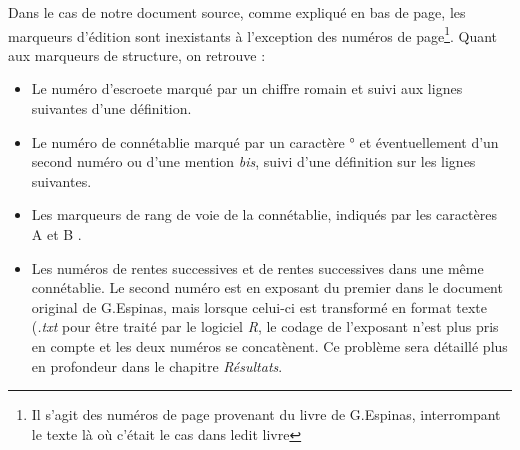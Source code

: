 Dans le cas de notre document source, comme expliqué en bas de page, les marqueurs d'édition sont inexistants à l'exception des numéros de page\footnote{ Il s'agit des numéros de page provenant du livre de G.Espinas, interrompant le texte là où c'était le cas dans ledit livre}. Quant aux marqueurs de structure, on retrouve :
\begin{itemize}
\item Le numéro d'escroete marqué par un chiffre romain et suivi aux lignes suivantes d'une définition.
\item Le numéro de connétablie marqué par un caractère \og ° \fg et éventuellement d'un second numéro ou d'une mention \textit{bis}, suivi d'une définition sur les lignes suivantes.
\item Les marqueurs de rang de voie de la connétablie, indiqués par les caractères \og A \fg et \og B \fg.
\item Les numéros de rentes successives et de rentes successives dans une même connétablie. Le second numéro est en exposant du premier dans le document original de G.Espinas, mais lorsque celui-ci est transformé en format texte (\textit{.txt} pour être traité par le logiciel \textit{R}, le codage de l'exposant n'est plus pris en compte et les deux numéros se concatènent. Ce problème sera détaillé plus en profondeur dans le chapitre \textit{Résultats}.  
\end{itemize}










